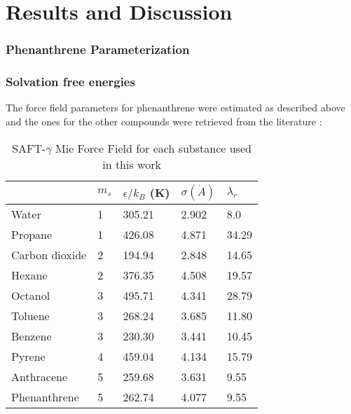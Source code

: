 \chapter{Results and Discussion} %

\label{Chapter5} %

\subsection{Phenanthrene Parameterization}


\subsection{Solvation free energies}

The force field parameters for phenanthrene were estimated as described above and the ones for the other compounds were retrieved from the literature \cite{lobanova2016,herdes2015,ervik2016,muller2017}:

\begin{table*}[h]
\center
  \caption{SAFT-$\gamma$ Mie Force Field for each substance used in this work}
  \label{tbl:parameters}
  \begin{tabular}{lllll}
    \hline
        & $m_s$ & $\epsilon/k_{B}$ (K) & $\sigma (\dot{A})$ & $\lambda_r$ \\
    \hline
    Water & 1 & 305.21 & 2.902 & 8.0 \\
    Propane & 1 & 426.08 & 4.871 & 34.29 \\
    Carbon dioxide  & 2 & 194.94 & 2.848 & 14.65 \\
    Hexane  & 2  & 376.35 & 4.508 & 19.57 \\  
    Octanol & 3 & 495.71 & 4.341 & 28.79 \\
    Toluene  & 3 & 268.24 & 3.685 & 11.80 \\
    Benzene  & 3 & 230.30 & 3.441 & 10.45 \\
    Pyrene  & 4 & 459.04 & 4.134 & 15.79 \\
    Anthracene & 5 & 259.68 & 3.631 & 9.55 \\
    Phenanthrene & 5 & 262.74 & 4.077 & 9.55 \\
    \hline
  \end{tabular}

\end{table*}


